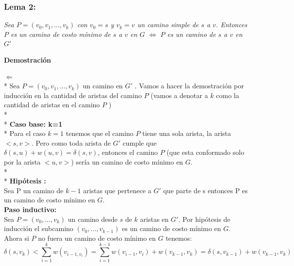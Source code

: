 \documentclass{article}
\begin{document}
    \subsubsection{Lema 2:}
        
    \noindent \textit{Sea $P = \left(v_0,v_1,\dots , v_k \right)$ con $v_0 = s$ y $v_k = v$ un camino simple de $s$ a $v$. Entonces $P$ es un 
    camino de costo m\'inimo de $s$ a $v$  en $G$ $\Longleftrightarrow$  $P$ es un camino de $s$ a $v$ en $G'$}
    
    
    \vspace{0.3cm}
    \noindent \textbf{Demostraci\'on} 
    
    \noindent $ \Longleftarrow $
    \\*
    Sea $P = \left(v_0,v_1,\dots , v_k \right)$  un camino en $G'$ . 
    Vamos a hacer la demostraci\'on por inducci\'on en la cantidad de aristas del camino $P$ (vamos a denotar a $k$ como la cantidad de aristas en el camino $P$ )
    \\*
    \\*
    \noindent \textbf{Caso base: k=1} 
    \\*
    Para el caso $k=1$ tenemos que el camino $P$ tiene una sola arista, la arista $<s,v>$. Pero como toda arista de $G'$ cumple que 
    $\delta\left(s,u\right) + w \left(u,v\right) = \delta\left(s,v\right)$, entonces el camino $P$ (que esta conformado solo por la 
    arista $<u,v>$) ser\'ia un camino de costo m\'inimo en $G$.
    \\*
    \\*
    \noindent \textbf{Hip\'otesis : }\\
    Sea P un camino de $k-1$ aristas que pertenece a $G'$ que parte de s entonces P es un camino de costo m\'inimo en $G$.\\

    \noindent \textbf{Paso inductivo:}\\ 
    Sea $P = \left(v_{0},\dots,v_{k}\right)$ un camino desde $s$ de $k$ aristas en $G'$. Por hip\'otesis de inducci\'on el subcamino $\left(v_0,\dots,v_{k-1}\right)$ es un camino de 
    costo m\'inimo en $G$. Ahora si $P$ no fuera un camino de costo m\'inimo en $G$ tenemos: 
    \begin{equation*}
        \delta \left(s,v_k\right) < \sum_{i=1}^{k} w\left(v_{i-1,v_i}\right) = \sum_{i=1}^{k-1} w\left(v_{i-1}, v_{i}\right) + w\left(v_{k-1}, v_{k}\right)  = \delta\left(s,v_{k-1}\right) + w\left(v_{k-1}, v_{k}\right)
    \end{equation*}
\end{document}
